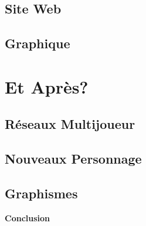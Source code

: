 \documentclass [11pt]{report}
\begin{document}
	\section{Site Web}

	\section{Graphique}

\chapter{Et Après?}
	\section{Réseaux Multijoueur}

	\section{Nouveaux Personnage}

	\section{Graphismes}
\newpage
\textbf{{\huge Conclusion}}
\end{document}
